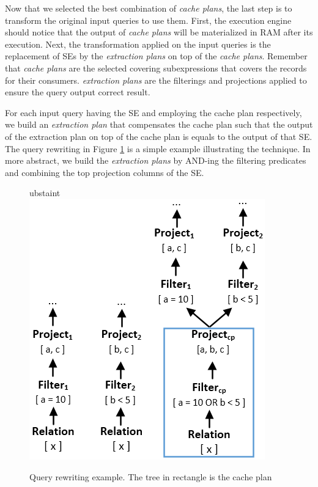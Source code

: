 Now that we selected the best combination of \emph{cache plans}, the last step is to transform the original input queries to use them. First, the execution engine should notice that the output of \emph{cache plans} will be materialized in RAM after its execution. Next, the transformation applied on the input queries is the replacement of SEs by the \emph{extraction plans} on top of the \emph{cache plans}. Remember that \emph{cache plans} are the selected covering subexpressions that covers the records for their consumers. \emph{extraction plans} are the filterings and projections applied to ensure the query output correct result.

For each input query having the SE and employing the cache plan respectively, we build an \emph{extraction plan} that compensates the cache plan such that the output of the extraction plan on top of the cache plan is equals to the output of that SE. The query rewriting in Figure \ref{fig:rewrite} is a simple example illustrating the technique. In more abstract, we build the \emph{extraction plans} by AND-ing the filtering predicates and combining the top projection columns of the SE.

\begin{figure}[!htb]
	\centering
ubstaint	\includegraphics[scale=0.55]{figures/rewrite}
	\caption{Query rewriting example. The tree in rectangle is the cache plan}
   	\label{fig:rewrite}
\end{figure}